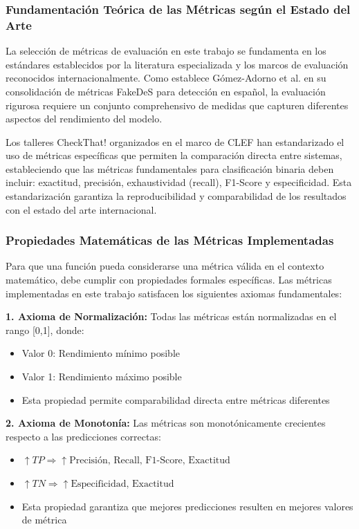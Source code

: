 \subsubsection{Fundamentación Teórica de las Métricas según el Estado del Arte}

La selección de métricas de evaluación en este trabajo se fundamenta en los estándares establecidos por la literatura especializada y los marcos de evaluación reconocidos internacionalmente. Como establece Gómez-Adorno et al. \cite{gomez2021overview} en su consolidación de métricas FakeDeS para detección en español, la evaluación rigurosa requiere un conjunto comprehensivo de medidas que capturen diferentes aspectos del rendimiento del modelo.

Los talleres CheckThat! organizados en el marco de CLEF \cite{alam2023overview, barron2023clef} han estandarizado el uso de métricas específicas que permiten la comparación directa entre sistemas, estableciendo que las métricas fundamentales para clasificación binaria deben incluir: exactitud, precisión, exhaustividad (recall), F1-Score y especificidad. Esta estandarización garantiza la reproducibilidad y comparabilidad de los resultados con el estado del arte internacional.

\subsubsection{Propiedades Matemáticas de las Métricas Implementadas}

Para que una función pueda considerarse una métrica válida en el contexto matemático, debe cumplir con propiedades formales específicas. Las métricas implementadas en este trabajo satisfacen los siguientes axiomas fundamentales:

\textbf{1. Axioma de Normalización:}
Todas las métricas están normalizadas en el rango [0,1], donde:
\begin{itemize}
    \item Valor 0: Rendimiento mínimo posible
    \item Valor 1: Rendimiento máximo posible
    \item Esta propiedad permite comparabilidad directa entre métricas diferentes
\end{itemize}

\textbf{2. Axioma de Monotonía:}
Las métricas son monotónicamente crecientes respecto a las predicciones correctas:
\begin{itemize}
    \item $\uparrow TP \Rightarrow \uparrow \text{Precisión, Recall, F1-Score, Exactitud}$
    \item $\uparrow TN \Rightarrow \uparrow \text{Especificidad, Exactitud}$
    \item Esta propiedad garantiza que mejores predicciones resulten en mejores valores de métrica
\end{itemize}

